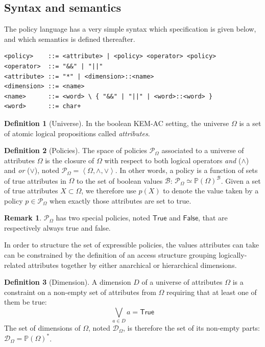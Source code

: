 \documentclass[a4paper]{article}
\theoremstyle{definition}
\newtheorem{definition}{Definition}[section]
\newtheorem*{remark}{Remark}
\newcommand{\powerset}[1]{\mathbb P(#1)}
\newcommand{\cB}{\mathcal{B}}
\newcommand{\cD}{\mathcal{D}}
\newcommand{\cP}{\mathcal{P}}
\newcommand{\True}{\mathsf{True}}
\newcommand{\False}{\mathsf{False}}
\begin{document}
\subsection{Syntax and semantics}
\label{sec:org7c3e9c9}

The policy language has a very simple syntax which specification is given below,
and which semantics is defined thereafter.
\label{org95a3b6d}
\begin{verbatim}
<policy>    ::= <attribute> | <policy> <operator> <policy>
<operator>  ::= "&&" | "||"
<attribute> ::= "*" | <dimension>::<name>
<dimension> ::= <name>
<name>      ::= <word> \ { "&&" | "||" | <word>::<word> }
<word>      ::= char+
\end{verbatim}

\begin{definition}[Universe]
In the boolean KEM-AC setting, the universe  \(\Omega\) is a set of atomic logical
propositions called \emph{attributes}.
\end{definition}

\begin{definition}[Policies]
The  space of  policies  \(\cP_\Omega\)  associated to  a  universe of  attributes
\(\Omega\) is the closure of \(\Omega\) with respect to both logical operators \emph{and}
(\(\land\))  and \emph{or}  (\(\lor\)), noted  \(\cP_\Omega =  \left< \Omega,  \land, \lor
\right>\). In other words,  a policy is a function of sets  of true attributes in
\(\Omega\)   to   the   set   of  boolean   values   \(\cB\):   \(\cP_\Omega   \simeq
\powerset{\Omega}^\cB\). Given  a set of  true attributes \(X \subset  \Omega\), we
therefore use \(p(X)\)  to denote the value  taken by a policy  \(p \in \cP_\Omega\)
when exactly those attributes are set to true.
\end{definition}

\begin{remark}
\(\cP_\Omega\)  has two  special policies,  noted \(\True\)  and \(\False\),  that are
respectively always true and false.
\end{remark}

In order to structure the set of expressible policies, the values attributes can
take  can be  constrained  by the  definition of  an  access structure  grouping
logically-related  attributes  together  by either  anarchical  or  hierarchical
dimensions.

\begin{definition}[Dimension]
A  dimension \(D\)  of a  universe of  attributes \(\Omega\)  is a  constraint on  a
non-empty set of attributes from \(\Omega\) requiring that at least one of them be
true:
\begin{equation}
  \tag{dimension}
  \bigvee_{a \in D} a = \True
\end{equation}
The set  of dimensions of \(\Omega\), noted \(\cD_\Omega\),  is therefore the
set of its non-empty parts:  \(\cD_\Omega = \powerset{\Omega}^*\).
\end{definition}
\end{document}
